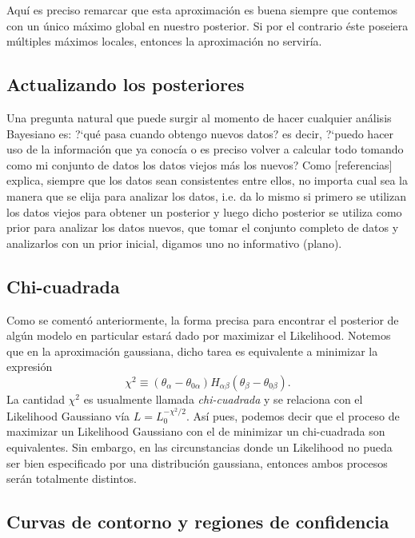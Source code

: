 \documentclass[onecolumn,           %
               showpacs,            %
               preprintnumbers,     %
               aps,                 %
               prl,          	    %
               letterpaper,             %
               superscriptaddress,      %
               nofootinbib,         %
               tightenlines,        %
               floats,floatfix      %
               ,usenatbib,
               ]{revtex4-1}
\begin{document}
Aqu\'i es preciso remarcar que esta aproximaci\'on es buena siempre que contemos con un \'unico m\'aximo global en nuestro posterior. Si por el contrario \'este poseiera m\'ultiples m\'aximos locales, entonces la aproximaci\'on no servir\'ia.

\subsection{Actualizando los posteriores}

Una pregunta natural que puede surgir al momento de hacer cualquier an\'alisis Bayesiano es: ?`qu\'e pasa cuando obtengo nuevos datos? es decir, ?`puedo hacer uso de la informaci\'on que ya conoc\'ia o es preciso volver a calcular todo tomando como mi conjunto de datos los datos viejos m\'as los nuevos? Como [referencias] explica, siempre que los datos sean consistentes entre ellos, no importa cual sea la manera que se elija para analizar los datos, i.e. da lo mismo si primero se utilizan los datos viejos para obtener un posterior y luego dicho posterior se utiliza como prior para analizar los datos nuevos, que tomar el conjunto completo de datos y analizarlos con un prior inicial, digamos uno no informativo (plano).

\subsection{Chi-cuadrada}

Como se coment\'o anteriormente, la forma precisa para encontrar el posterior de alg\'un modelo en particular estar\'a dado por maximizar el Likelihood. Notemos que en la aproximaci\'on gaussiana, dicho tarea es equivalente a minimizar la expresi\'on 
\begin{equation}\label{chi2}
\chi^2\equiv(\theta_\alpha-\theta_{0\alpha})H_{\alpha\beta}(\theta_\beta-\theta_{0\beta}).
\end{equation}
La cantidad $\chi^2$ es usualmente llamada \textit{chi-cuadrada} y se relaciona con el Likelihood Gaussiano v\'ia $L=L_0^{-\chi^2/2}$. As\'i pues, podemos decir que el proceso de maximizar un Likelihood Gaussiano con el de minimizar un chi-cuadrada son equivalentes. Sin embargo, en las circunstancias donde un Likelihood no pueda ser bien especificado por una distribuci\'on gaussiana, entonces ambos procesos ser\'an totalmente distintos.

\subsection{Curvas de contorno y regiones de confidencia}
\end{document}
